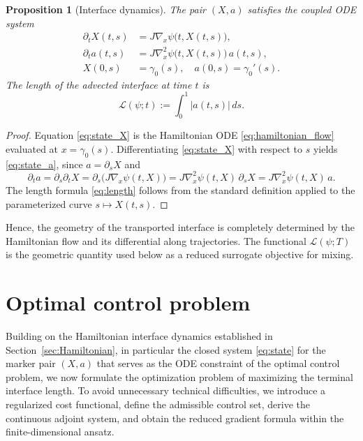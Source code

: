 \documentclass[12pt, reqno]{amsart}
\theoremstyle{plain}
\newtheorem{prop}[thm]{Proposition}
\theoremstyle{definition}
\numberwithin{equation}{section}
\numberwithin{figure}{section}
\numberwithin{algorithm}{section}
\begin{document}
\begin{prop}[Interface dynamics]\label{prop:interface_ode}
The pair $(X,a)$ satisfies the coupled ODE system
\begin{subequations}\label{eq:state}
\begin{align}
\partial_t X(t,s) &= J\nabla_x \psi\bigl(t,X(t,s)\bigr),\label{eq:state_X}\\
\partial_t a(t,s) &= J\nabla_x^2 \psi\bigl(t,X(t,s)\bigr)\,a(t,s),\label{eq:state_a}\\
X(0,s) &= \gamma_0(s),\quad a(0,s) = \gamma_0'(s).
\end{align}
\end{subequations}
The length of the advected interface at time $t$ is
\begin{equation}\label{eq:length}
\mathcal{L}(\psi;t):=\int_0^1 |a(t,s)|\,ds.
\end{equation}
\end{prop}

\begin{proof}
Equation \eqref{eq:state_X} is the Hamiltonian ODE \eqref{eq:hamiltonian_flow} evaluated at $x=\gamma_0(s)$. Differentiating \eqref{eq:state_X} with respect to $s$ yields \eqref{eq:state_a}, since $a=\partial_s X$ and
\[
\partial_t a=\partial_s\partial_t X=\partial_s\bigl(J\nabla_x \psi(t,X)\bigr)=J\nabla_x^2 \psi(t,X)\,\partial_s X=J\nabla_x^2 \psi(t,X)\,a.
\]
The length formula \eqref{eq:length} follows from the standard definition applied to the parameterized curve $s\mapsto X(t,s)$.
\end{proof}

Hence, the geometry of the transported interface is completely determined by the Hamiltonian flow and its differential along trajectories. The functional $\mathcal{L}(\psi;T)$ is the geometric quantity used below as a reduced surrogate objective for mixing.


\section{Optimal control problem}\label{sec:ocp}

Building on the Hamiltonian interface dynamics established in Section~\ref{sec:Hamiltonian}, in particular the closed system \eqref{eq:state} for the marker pair $(X,a)$ that serves as the ODE constraint of the optimal control problem, we now formulate the optimization problem of maximizing the terminal interface length. To avoid unnecessary technical difficulties, we introduce a regularized cost functional, define the admissible control set, derive the continuous adjoint system, and obtain the reduced gradient formula within the finite-dimensional ansatz.
\end{document}
